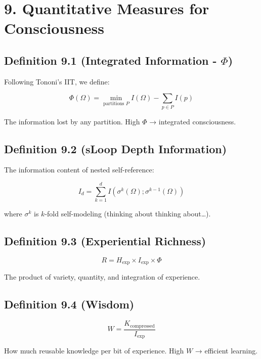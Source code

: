 \documentclass[
  11pt,
  letterpaper,
  twoside,
  openright]{book}
\begin{document}
\section{9. Quantitative Measures for
Consciousness}\label{quantitative-measures-for-consciousness}

\subsection{\texorpdfstring{Definition 9.1 (Integrated Information -
\(\Phi\))}{Definition 9.1 (Integrated Information - \textbackslash Phi)}}\label{definition-9.1-integrated-information---phi}

Following Tononi's IIT, we define:

\[\Phi(\Omega) = \min_{\text{partitions } P} I(\Omega) - \sum_{p \in P} I(p)\]

The information lost by any partition. High \(\Phi\) → integrated
consciousness.

\subsection{Definition 9.2 (sLoop Depth
Information)}\label{definition-9.2-sloop-depth-information}

The information content of nested self-reference:

\[I_d = \sum_{k=1}^{d} I(\sigma^k(\Omega); \sigma^{k-1}(\Omega))\]

where \(\sigma^k\) is \(k\)-fold self-modeling (thinking about thinking
about\ldots).

\subsection{Definition 9.3 (Experiential
Richness)}\label{definition-9.3-experiential-richness}

\[R = H_{\text{exp}} \times I_{\text{exp}} \times \Phi\]

The product of variety, quantity, and integration of experience.

\subsection{Definition 9.4 (Wisdom)}\label{definition-9.4-wisdom}

\[W = \frac{K_{\text{compressed}}}{I_{\text{exp}}}\]

How much reusable knowledge per bit of experience. High \(W\) →
efficient learning.
\end{document}
